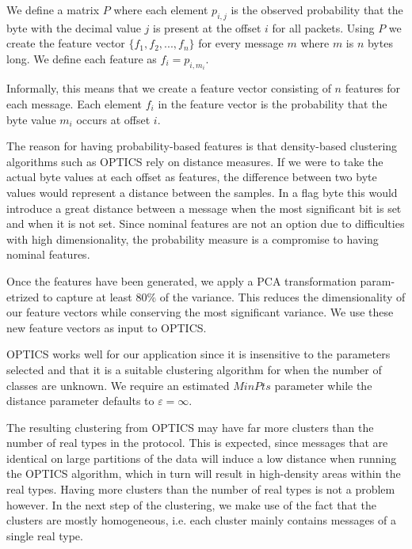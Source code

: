 \documentclass[a4paper]{report}
\begin{document}
We define a matrix $P$ where each element $p_{i,j}$ is the observed probability
that the byte with the decimal value $j$ is present at the offset $i$ for all
packets. Using $P$ we create the feature vector $\{f_1, f_2, ..., f_n\}$ for
every message $m$ where $m$ is $n$ bytes long. We define each feature as
$f_i = p_{i, m_i}$.

Informally, this means that we create a feature vector consisting of $n$
features for each message. Each element $f_i$ in the feature vector is the
probability that the byte value $m_i$ occurs at offset $i$.

The reason for having probability-based features is that density-based
clustering algorithms such as OPTICS rely on distance measures. If we were to
take the actual byte values at each offset as features, the difference between
two byte values would represent a distance between the samples. In a flag byte
this would introduce a great distance between a message when the most
significant bit is set and when it is not set. Since nominal features are not
an option due to difficulties with high dimensionality, the probability
measure is a compromise to having nominal features.

Once the features have been generated, we apply a PCA transformation
param-etrized to capture at least $80\%$ of the variance. This reduces the
dimensionality of our feature vectors while conserving the most significant
variance. We use these new feature vectors as input to OPTICS.

OPTICS works well for our application since it is insensitive to the parameters
selected and that it is a suitable clustering algorithm for when the number of
classes are unknown. We require an estimated $MinPts$ parameter while the distance
parameter defaults to $\varepsilon = \infty$.

The resulting clustering from OPTICS may have far more clusters than the number
of real types in the protocol. This is expected, since messages that are
identical on large partitions of the data will induce a low distance when
running the OPTICS algorithm, which in turn will result in high-density
areas within the real types. Having more clusters than the number of real
types is not a problem however. In the next step of the clustering, we make
use of the fact that the clusters are mostly homogeneous, i.e. each cluster mainly
contains messages of a single real type.
\end{document}
